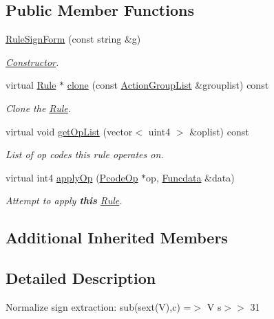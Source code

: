 \subsection*{Public Member Functions}
\begin{DoxyCompactItemize}
\item 
\mbox{\hyperlink{class_rule_sign_form_a4cdb9fa6bd841273118b599b46d1e982}{Rule\+Sign\+Form}} (const string \&g)
\begin{DoxyCompactList}\small\item\em \mbox{\hyperlink{class_constructor}{Constructor}}. \end{DoxyCompactList}\item 
virtual \mbox{\hyperlink{class_rule}{Rule}} $\ast$ \mbox{\hyperlink{class_rule_sign_form_a41eb49ee67b70035b228b576ad7ab1e4}{clone}} (const \mbox{\hyperlink{class_action_group_list}{Action\+Group\+List}} \&grouplist) const
\begin{DoxyCompactList}\small\item\em Clone the \mbox{\hyperlink{class_rule}{Rule}}. \end{DoxyCompactList}\item 
virtual void \mbox{\hyperlink{class_rule_sign_form_a185d3091b7022585408a27668728d370}{get\+Op\+List}} (vector$<$ uint4 $>$ \&oplist) const
\begin{DoxyCompactList}\small\item\em List of op codes this rule operates on. \end{DoxyCompactList}\item 
virtual int4 \mbox{\hyperlink{class_rule_sign_form_a4d0250a44bacb1048487280de4ffcd3d}{apply\+Op}} (\mbox{\hyperlink{class_pcode_op}{Pcode\+Op}} $\ast$op, \mbox{\hyperlink{class_funcdata}{Funcdata}} \&data)
\begin{DoxyCompactList}\small\item\em Attempt to apply {\bfseries{this}} \mbox{\hyperlink{class_rule}{Rule}}. \end{DoxyCompactList}\end{DoxyCompactItemize}
\subsection*{Additional Inherited Members}


\subsection{Detailed Description}
Normalize sign extraction\+: {\ttfamily sub(sext(\+V),c) =$>$ V s$>$$>$ 31} 

